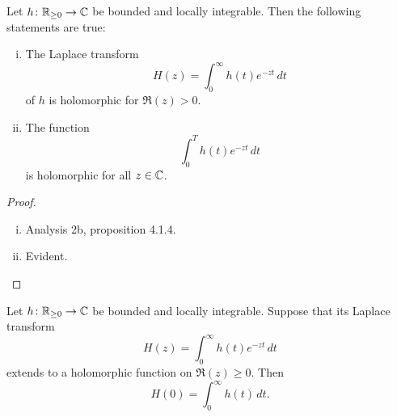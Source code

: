 \begin{lema}
Let $h \colon \mathbb{R}_{\geq 0} \to \mathbb{C}$ be bounded and locally
integrable. Then the following statements are true:

\begin{enumerate}[i)]
\item The Laplace transform
\[
H(z) = \int_0^\infty h(t) e^{-zt}\,dt
\]
of $h$ is holomorphic for $\Re(z) > 0$.
\item The function
\[
\int_0^T h(t) e^{-zt}\,dt
\]
is holomorphic for all $z \in \mathbb{C}$.
\end{enumerate}
\end{lema}

\begin{proof}
\phantom{i}
\begin{enumerate}[i)]
\item Analysis 2b, proposition 4.1.4.
\item Evident. \qedhere %
\end{enumerate}
\end{proof}

\begin{izrek}
\label{prime:thm:ana}
Let $h \colon \mathbb{R}_{\geq 0} \to \mathbb{C}$ be bounded and locally
integrable. Suppose that its Laplace transform
\[
H(z) = \int_0^\infty h(t) e^{-zt}\,dt
\]
extends to a holomorphic function on $\Re(z) \geq 0$. Then
\[
H(0) = \int_0^\infty h(t)\,dt.
\]
\end{izrek}

